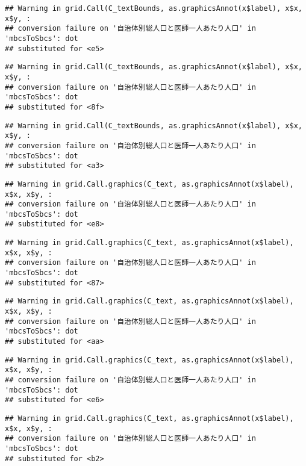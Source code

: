 \documentclass[
]{article}
\begin{document}
\begin{verbatim}
## Warning in grid.Call(C_textBounds, as.graphicsAnnot(x$label), x$x, x$y, :
## conversion failure on '自治体別総人口と医師一人あたり人口' in 'mbcsToSbcs': dot
## substituted for <e5>
\end{verbatim}

\begin{verbatim}
## Warning in grid.Call(C_textBounds, as.graphicsAnnot(x$label), x$x, x$y, :
## conversion failure on '自治体別総人口と医師一人あたり人口' in 'mbcsToSbcs': dot
## substituted for <8f>
\end{verbatim}

\begin{verbatim}
## Warning in grid.Call(C_textBounds, as.graphicsAnnot(x$label), x$x, x$y, :
## conversion failure on '自治体別総人口と医師一人あたり人口' in 'mbcsToSbcs': dot
## substituted for <a3>
\end{verbatim}

\begin{verbatim}
## Warning in grid.Call.graphics(C_text, as.graphicsAnnot(x$label), x$x, x$y, :
## conversion failure on '自治体別総人口と医師一人あたり人口' in 'mbcsToSbcs': dot
## substituted for <e8>
\end{verbatim}

\begin{verbatim}
## Warning in grid.Call.graphics(C_text, as.graphicsAnnot(x$label), x$x, x$y, :
## conversion failure on '自治体別総人口と医師一人あたり人口' in 'mbcsToSbcs': dot
## substituted for <87>
\end{verbatim}

\begin{verbatim}
## Warning in grid.Call.graphics(C_text, as.graphicsAnnot(x$label), x$x, x$y, :
## conversion failure on '自治体別総人口と医師一人あたり人口' in 'mbcsToSbcs': dot
## substituted for <aa>
\end{verbatim}

\begin{verbatim}
## Warning in grid.Call.graphics(C_text, as.graphicsAnnot(x$label), x$x, x$y, :
## conversion failure on '自治体別総人口と医師一人あたり人口' in 'mbcsToSbcs': dot
## substituted for <e6>
\end{verbatim}

\begin{verbatim}
## Warning in grid.Call.graphics(C_text, as.graphicsAnnot(x$label), x$x, x$y, :
## conversion failure on '自治体別総人口と医師一人あたり人口' in 'mbcsToSbcs': dot
## substituted for <b2>
\end{verbatim}
\end{document}
